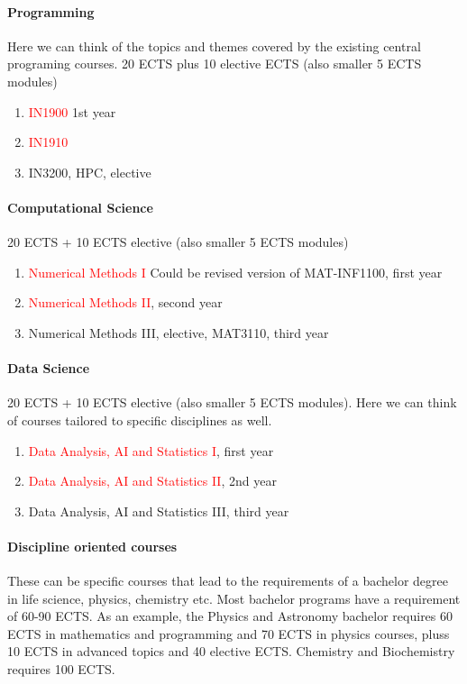 \documentclass[oneside,final,10pt]{article}
\begin{document}
\paragraph{Programming}
Here we can think of the topics and themes covered by the existing central programing courses.
20 ECTS plus 10 elective ECTS (also smaller 5 ECTS modules)
\begin{enumerate}
    \item \textcolor{red}{IN1900} 1st year
    \item \textcolor{red}{IN1910}
    \item IN3200, HPC, elective
\end{enumerate}


\paragraph{Computational Science}
20 ECTS + 10 ECTS elective (also smaller 5 ECTS modules)
\begin{enumerate}
    \item \textcolor{red}{Numerical Methods I} Could be revised version of MAT-INF1100, first year
    \item \textcolor{red}{Numerical Methods II}, second year
    \item Numerical Methods III, elective, MAT3110, third year
\end{enumerate}

\paragraph{Data Science}
20 ECTS + 10 ECTS elective (also smaller 5 ECTS modules). Here we can think of courses tailored to specific disciplines as well. 
\begin{enumerate}
    \item \textcolor{red}{Data Analysis, AI and Statistics I}, first year
    \item \textcolor{red}{Data Analysis, AI and Statistics II}, 2nd year
    \item Data Analysis, AI and Statistics III, third year
\end{enumerate}

\paragraph{Discipline oriented courses}

These can be specific courses that lead to the requirements of a bachelor degree in life science, physics, chemistry etc. Most bachelor programs have a requirement of 60-90 ECTS. As an example, the Physics and Astronomy bachelor requires 60 ECTS in mathematics and programming and 70 ECTS in physics courses, pluss 10 ECTS in advanced topics and 40 elective ECTS.  
Chemistry and Biochemistry requires 100 ECTS. 
\end{document}
